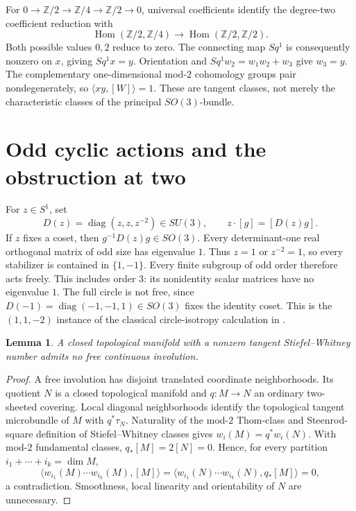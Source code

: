 \documentclass[10pt]{article}
\newtheorem{lemma}{Lemma}
\begin{document}
For \(0\to\mathbb Z/2\to\mathbb Z/4\to\mathbb Z/2\to0\),
universal coefficients identify the degree-two coefficient reduction with
\[
 \operatorname{Hom}(\mathbb Z/2,\mathbb Z/4)
 \longrightarrow\operatorname{Hom}(\mathbb Z/2,\mathbb Z/2).
\]
Both possible values \(0,2\) reduce to zero. The connecting map \(Sq^1\)
is consequently nonzero on \(x\), giving \(Sq^1x=y\).
Orientation and \(Sq^1w_2=w_1w_2+w_3\) give \(w_3=y\).
The complementary one-dimensional mod-\(2\) cohomology groups pair
nondegenerately, so \(\langle xy,[W]\rangle=1\).
These are tangent classes, not merely the characteristic classes of the
principal \(SO(3)\)-bundle.

\section{Odd cyclic actions and the obstruction at two}
For \(z\in S^1\), set
\[
 D(z)=\operatorname{diag}(z,z,z^{-2})\in SU(3),\qquad
 z\cdot[g]=[D(z)g].
\]
If \(z\) fixes a coset, then \(g^{-1}D(z)g\in SO(3)\).
Every determinant-one real orthogonal matrix of odd size has eigenvalue
\(1\). Thus \(z=1\) or \(z^{-2}=1\), so every stabilizer is contained in
\(\{1,-1\}\).
Every finite subgroup of odd order therefore acts freely. This includes
order \(3\): its nonidentity scalar matrices have no eigenvalue \(1\).
The full circle is not free, since
\(D(-1)=\operatorname{diag}(-1,-1,1)\in SO(3)\) fixes the identity coset.
This is the \((1,1,-2)\) instance of the classical circle-isotropy
calculation in \cite[Proposition~4.2]{Y}.

\begin{lemma}\label{cover}
A closed topological manifold with a nonzero tangent Stiefel--Whitney
number admits no free continuous involution.
\end{lemma}
\begin{proof}
A free involution has disjoint translated coordinate neighborhoods.
Its quotient \(N\) is a closed topological manifold and
\(q:M\to N\) an ordinary two-sheeted covering.
Local diagonal neighborhoods identify the topological tangent
microbundle of \(M\) with \(q^*\tau_N\).
Naturality of the mod-\(2\) Thom-class and Steenrod-square definition of
Stiefel--Whitney classes gives \(w_i(M)=q^*w_i(N)\).
With mod-\(2\) fundamental classes, \(q_*[M]=2[N]=0\).
Hence, for every partition \(i_1+\cdots+i_k=\dim M\),
\[
 \langle w_{i_1}(M)\cdots w_{i_k}(M),[M]\rangle
 =\langle w_{i_1}(N)\cdots w_{i_k}(N),q_*[M]\rangle=0,
\]
a contradiction. Smoothness, local linearity and orientability of \(N\)
are unnecessary.
\end{proof}
\end{document}

